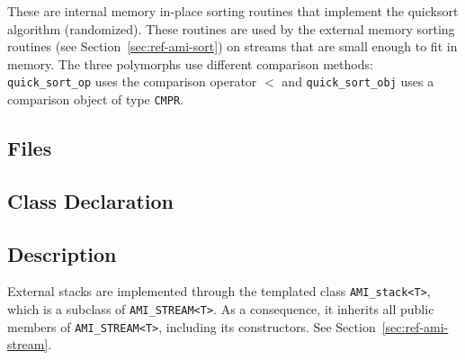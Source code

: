 These are internal memory in-place sorting routines that implement the
quicksort algorithm (randomized).  These routines are used by the external memory sorting
routines (see Section~\ref{sec:ref-ami-sort}) on streams that are
small enough to fit in memory.  The three polymorphs use different
comparison methods: \lstinline|quick_sort_op| uses the comparison
operator $<$ and \lstinline|quick_sort_obj| uses a comparison object
of type \lstinline|CMPR|.




\tobewritten



\tobewritten




\tobewritten





\subsection{Files}
  \btabb
         {}
  \etabb

\subsection{Class Declaration}
   \btabb
         {}
   \etabb

\subsection{Description}
External stacks are implemented through the
templated class \lstinline|AMI_stack<T>|, which is a subclass of
\lstinline|AMI_STREAM<T>|. As a
consequence, it inherits all public members of
\lstinline|AMI_STREAM<T>|, including its constructors. See
Section~\ref{sec:ref-ami-stream}.

